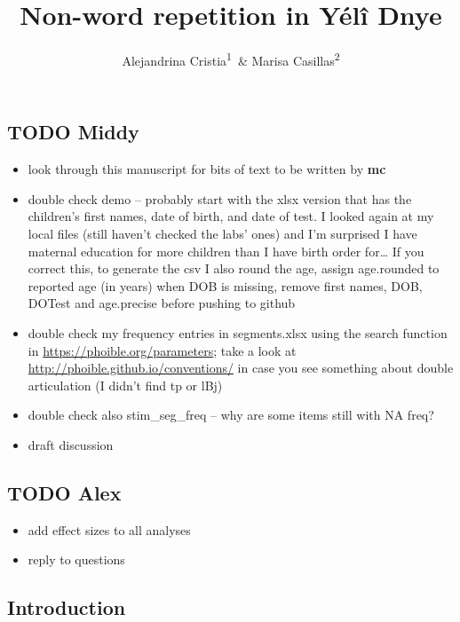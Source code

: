 \documentclass[english,,man,floatsintext]{apa6}
\title{Non-word repetition in Yélî Dnye}
\author{Alejandrina Cristia\textsuperscript{1}~\& Marisa
Casillas\textsuperscript{2}}
\date{}
\providecommand{\tightlist}{%
  \setlength{\itemsep}{0pt}\setlength{\parskip}{0pt}}
\begin{document}
\maketitle

\subsection{TODO Middy}\label{todo-middy}

\begin{itemize}
\tightlist
\item
  look through this manuscript for bits of text to be written by
  \textbf{mc}
\item
  double check demo -- probably start with the xlsx version that has the
  children's first names, date of birth, and date of test. I looked
  again at my local files (still haven't checked the labs' ones) and I'm
  surprised I have maternal education for more children than I have
  birth order for\ldots{} If you correct this, to generate the csv I
  also round the age, assign age.rounded to reported age (in years) when
  DOB is missing, remove first names, DOB, DOTest and age.precise before
  pushing to github
\item
  double check my frequency entries in segments.xlsx using the search
  function in \url{https://phoible.org/parameters}; take a look at
  \url{http://phoible.github.io/conventions/} in case you see something
  about double articulation (I didn't find tp or lBj)
\item
  double check also stim\_seg\_freq -- why are some items still with NA
  freq?
\item
  draft discussion
\end{itemize}

\subsection{TODO Alex}\label{todo-alex}

\begin{itemize}
\tightlist
\item
  add effect sizes to all analyses
\item
  reply to questions
\end{itemize}

\subsection{Introduction}\label{introduction}
\end{document}
